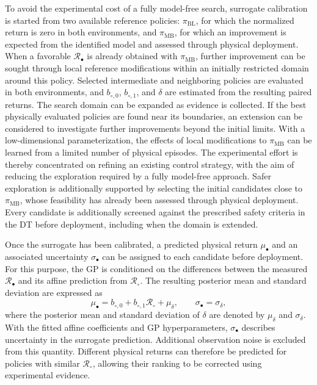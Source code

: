 \documentclass[journal]{IEEEtran}
\begin{document}
To avoid the experimental cost of a fully model-free search, surrogate calibration is started from two available reference policies: $\pi_{\mathrm{BL}}$, for which the normalized return is zero in both environments, and $\pi_{\mathrm{MB}}$, for which an improvement is expected from the identified model and assessed through physical deployment. When a favorable $\mathcal R_\bullet$ is already obtained with $\pi_{\mathrm{MB}}$, further improvement can be sought through local reference modifications within an initially restricted domain around this policy. Selected intermediate and neighboring policies are evaluated in both environments, and $b_{\circ,0}$, $b_{\circ,1}$, and $\delta$ are estimated from the resulting paired returns.
The search domain can be expanded as evidence is collected. If the best physically evaluated policies are found near its boundaries, an extension can be considered to investigate further improvements beyond the initial limits. With a low-dimensional parameterization, the effects of local modifications to $\pi_{\mathrm{MB}}$ can be learned from a limited number of physical episodes. The experimental effort is thereby concentrated on refining an existing control strategy, with the aim of reducing the exploration required by a fully model-free approach. Safer exploration is additionally supported by selecting the initial candidates close to $\pi_{\mathrm{MB}}$, whose feasibility has already been assessed through physical deployment. Every candidate is additionally screened against the prescribed safety criteria in the DT before deployment, including when the domain is extended.

Once the surrogate has been calibrated, a predicted physical return $\mu_\bullet$ and an associated uncertainty $\sigma_\bullet$ can be assigned to each candidate before deployment. For this purpose, the GP is conditioned on the differences between the measured $\mathcal R_\bullet$ and its affine prediction from $\mathcal R_\circ$. The resulting posterior mean and standard deviation are expressed as
\begin{equation}
 \mu_\bullet=b_{\circ,0}
   +b_{\circ,1}\mathcal R_\circ+\mu_\delta, 
 \qquad \sigma_\bullet=\sigma_\delta,
 \label{eq:rt-surrogate-mean}
\end{equation}
where the posterior mean and standard deviation of $\delta$ are denoted by $\mu_\delta$ and $\sigma_\delta$. With the fitted affine coefficients and GP hyperparameters, $\sigma_\bullet$ describes uncertainty in the surrogate prediction. Additional observation noise is excluded from this quantity. Different physical returns can therefore be predicted for policies with similar $\mathcal R_\circ$, allowing their ranking to be corrected using experimental evidence.
\end{document}
